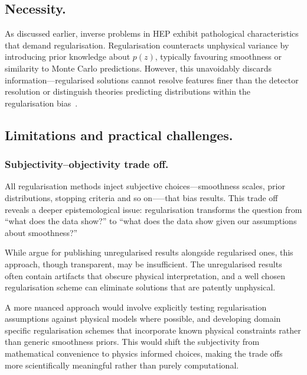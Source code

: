     \subsection{Necessity.}  
         As discussed earlier, inverse problems in HEP exhibit pathological characteristics that demand regularisation.
        Regularisation counteracts unphysical variance by introducing prior knowledge about \(p(z)\), typically favouring smoothness or similarity to Monte Carlo predictions.
        However, this unavoidably discards information---regularised solutions cannot resolve features finer than the detector resolution or distinguish theories predicting distributions within the regularisation bias~\cite{Bohm2025IntroductionPhysicists,multhei_iterative_1987}.

    \subsection{Limitations and practical challenges.}  
        \subsubsection{Subjectivity--objectivity trade off.}  
            All regularisation methods inject subjective choices---smoothness scales, prior distributions, stopping criteria and so on—--that bias results.
            This trade off reveals a deeper epistemological issue: regularisation transforms the question from ``what does the data show?'' to ``what does the data show given our assumptions about smoothness?''
            
            While \cite{zech_regularization_2011,kuusela_uncertainty_2016} argue for publishing unregularised results alongside regularised ones, this approach, though transparent, may be insufficient.
            The unregularised results often contain artifacts that obscure physical interpretation, and a well chosen regularisation scheme can eliminate solutions that are patently unphysical.
            
            A more nuanced approach would involve explicitly testing regularisation assumptions against physical models where possible, and developing domain specific regularisation schemes that incorporate known physical constraints rather than generic smoothness priors.
            This would shift the subjectivity from mathematical convenience to physics informed choices, making the trade offs more scientifically meaningful rather than purely computational.

